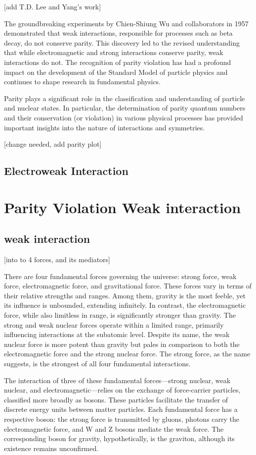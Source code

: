 [add T.D. Lee and Yang's work]

The groundbreaking experiments by Chien-Shiung Wu and collaborators in 1957 demonstrated that weak interactions, responsible for processes such as beta decay, do not conserve parity. This discovery led to the revised understanding that while electromagnetic and strong interactions conserve parity, weak interactions do not. The recognition of parity violation has had a profound impact on the development of the Standard Model of particle physics and continues to shape research in fundamental physics.

Parity plays a significant role in the classification and understanding of particle and nuclear states. In particular, the determination of parity quantum numbers and their conservation (or violation) in various physical processes has provided important insights into the nature of interactions and symmetries.

 [change needed, add parity plot]
\subsection{Electroweak Interaction}

\section{Parity Violation Weak interaction}

\subsection{weak interaction}
[into to 4 forces, and its mediators]

There are four fundamental forces governing the universe: strong force, weak force, electromagnetic force, and gravitational force. These forces vary in terms of their relative strengths and ranges. Among them, gravity is the most feeble, yet its influence is unbounded, extending infinitely. In contrast, the electromagnetic force, while also limitless in range, is significantly stronger than gravity. The strong and weak nuclear forces operate within a limited range, primarily influencing interactions at the subatomic level. Despite its name, the weak nuclear force is more potent than gravity but pales in comparison to both the electromagnetic force and the strong nuclear force. The strong force, as the name suggests, is the strongest of all four fundamental interactions.

The interaction of three of these fundamental forces—strong nuclear, weak nuclear, and electromagnetic—relies on the exchange of force-carrier particles, classified more broadly as bosons. These particles facilitate the transfer of discrete energy units between matter particles. Each fundamental force has a respective boson: the strong force is transmitted by gluons, photons carry the electromagnetic force, and W and Z bosons mediate the weak force. The corresponding boson for gravity, hypothetically, is the graviton, although its existence remains unconfirmed.

